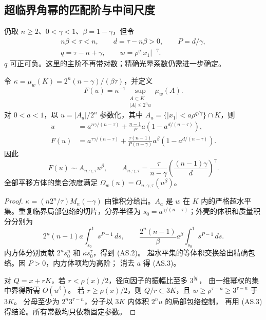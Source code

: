 \subsection{超临界角幂的匹配阶与中间尺度}\label{subsec:supercritical-angular}
仍取 $n\ge2$、$0<\gamma<1$、$\beta=1-\gamma$，但令
\[
\begin{gathered}
 n\beta<\tau<n,\qquad d=\tau-n\beta>0,\qquad P=d/\gamma,\\
 q=\tau-n+\gamma,\qquad w=\rho^q|x_1|^{-\gamma}.
\end{gathered}\tag{AS.1}
\]
$q$ 可正可负。这里的主阶不再带对数；精确光晕系数仍需进一步确定。

\begin{lemma}[超临界局部包络]\label{lem:supercritical-local}
令 $\kappa=\mu_w(K)=2^n(n-\gamma)/(\beta\tau)$，并定义
\[
 F(u)=\kappa^{-1}\sup_{\substack{A\subset K\\|A|\le2^nu}}\mu_w(A).
\]
对 $0<a<1$，以 $u=|A_a|/2^n$ 参数化，其中
$A_a=\{|x_1|<a\rho^{q/\gamma}\}\cap K$，则
\[
\begin{aligned}
 u&=a^{n\gamma/(n-\tau)}+\frac{n-1}{P}a(1-a^{d/(n-\tau)}),\\
 F(u)&=a^{\tau\gamma/(n-\tau)}+
 \frac{\tau(n-1)}{P(n-\gamma)}a^\beta(1-a^{d/(n-\tau)}).
\end{aligned}\tag{AS.2}
\]
因此
\[
 F(u)\sim A_{n,\gamma,\tau}u^\beta,\qquad
 A_{n,\gamma,\tau}=\frac{\tau}{n-\gamma}
 \left(\frac{(n-1)\gamma}{d}\right)^\gamma.\tag{AS.3}
\]
全部平移方体的集合浓度满足 $\Omega_w(u)=O_{n,\gamma,\tau}(u^\beta)$。
\end{lemma}
\begin{proof}
$\kappa=(n2^n/\tau)M_n(-\gamma)$ 由锥积分给出。$A_a$ 是 $w$ 在 $K$ 内的严格超水平集。重复临界局部包络的切片，分界半径为
$s_0=a^{\gamma/(n-\tau)}$；外壳的体积和质量积分分别为
\[
 2^n(n-1)a\int_{s_0}^1s^{P-1}\,ds,\qquad
 \frac{2^n(n-1)}\beta a^\beta\int_{s_0}^1s^{P-1}\,ds.
\]
内方体分别贡献 $2^ns_0^n$ 和 $\kappa s_0^\tau$，得到 (AS.2)。
超水平集的等体积交换给出精确包络。因 $P>0$，内方体项均为高阶；
消去 $a$ 得 (AS.3)。

对 $Q=x+rK$，若 $r<\rho(x)/2$，径向因子的振幅比至多 $3^{|q|}$，
由一维幂权的集中界得所需 $O(u^\beta)$。
若 $r\ge\rho(x)/2$，则 $Q/r\subset3K$，且
$w\ge\rho^{\tau-n}\ge3^{\tau-n}$ 于 $3K$。
分母至少为 $2^n3^{\tau-n}$，分子以 $3K$ 内体积 $2^nu$ 的局部包络控制，
再用 (AS.3) 得结论。所有常数均只依赖固定参数。
\end{proof}

